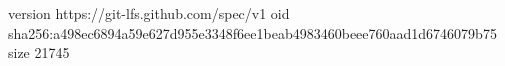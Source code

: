 version https://git-lfs.github.com/spec/v1
oid sha256:a498ec6894a59e627d955e3348f6ee1beab4983460beee760aad1d6746079b75
size 21745
